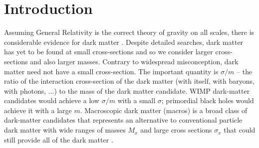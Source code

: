 \documentclass[%
 reprint,
 amsmath,amssymb,
 aps,
 nofootinbib, %
]{revtex4-2}
\begin{document}
\maketitle


\section{Introduction} %
\label{sec:introduction}

    Assuming General Relativity is the correct theory of gravity on all scales, there is considerable evidence for dark matter \citep{Tanabashi2018}. Despite detailed searches, dark matter has yet to be found at small cross-sections and so we consider larger cross-sections and also larger masses.
   Contrary to widespread misconception, dark matter need not have a small cross-section. The important quantity is $\sigma/m$ -- the ratio of the interaction cross-section of the dark matter (with itself, with baryons, with photons, ...) to the mass of the dark matter candidate.  WIMP dark-matter candidates would achieve a low $\sigma/m$ with a small $\sigma$; primordial black holes would achieve it with a large $m$.
    Macroscopic dark matter (macros) is a broad class of dark-matter candidates that represents an alternative to conventional particle dark matter with wide ranges of masses $M_x$ and large cross sections $\sigma_x$ that could still provide all of the dark matter \citep{jacobs2015macro}.
\end{document}
